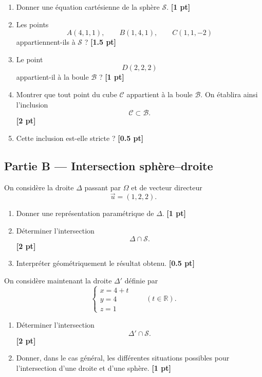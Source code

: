 \documentclass[11pt,a4paper]{article}
\newcommand{\R}{\mathbb{R}}
\newcommand{\Boule}{\mathcal{B}}
\newcommand{\Sphere}{\mathcal{S}}
\newcommand{\Cube}{\mathcal{C}}
\newcommand{\barq}[1]{\hfill{\small\textbf{[#1 pt]}}}
\begin{document}
\begin{enumerate}[label=\textbf{\arabic*.}]
    \item Donner une équation cartésienne de la sphère \(\Sphere\). \barq{1}

    \item Les points
    \[
    A(4,1,1),\qquad B(1,4,1),\qquad C(1,1,-2)
    \]
    appartiennent-ils à \(\Sphere\) ? \barq{1.5}

    \item Le point
    \[
    D(2,2,2)
    \]
    appartient-il à la boule \(\Boule\) ? \barq{1}

    \item Montrer que tout point du cube \(\Cube\) appartient à la boule \(\Boule\).  
    On établira ainsi l'inclusion
    \[
    \Cube\subset \Boule.
    \]
    \barq{2}

    \item Cette inclusion est-elle stricte ? \barq{0.5}
\end{enumerate}

\subsection*{Partie B --- Intersection sphère--droite}

On considère la droite \(\Delta\) passant par \(\Omega\) et de vecteur directeur
\[
\vec u=(1,2,2).
\]

\begin{enumerate}[label=\textbf{\arabic*.},resume]
    \item Donner une représentation paramétrique de \(\Delta\). \barq{1}

    \item Déterminer l'intersection
    \[
    \Delta\cap \Sphere.
    \]
    \barq{2}

    \item Interpréter géométriquement le résultat obtenu. \barq{0.5}
\end{enumerate}

On considère maintenant la droite \(\Delta'\) définie par
\[
\begin{cases}
x=4+t\\
y=4\\
z=1
\end{cases}
\qquad (t\in\R).
\]

\begin{enumerate}[label=\textbf{\arabic*.},resume]
    \item Déterminer l'intersection
    \[
    \Delta'\cap \Sphere.
    \]
    \barq{2}

    \item Donner, dans le cas général, les différentes situations possibles pour l'intersection d'une droite et d'une sphère. \barq{1}
\end{enumerate}
\end{document}
